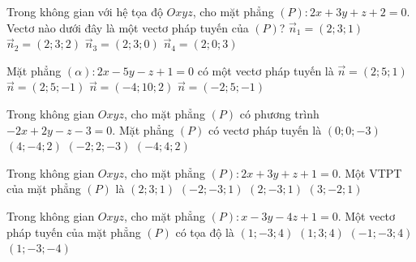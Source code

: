 \begin{ex}%
	Trong không  gian với hệ tọa độ $Oxyz$, cho mặt phẳng $(P)\colon 2x + 3y + z + 2 = 0$. Vectơ nào dưới đây là một vectơ pháp tuyến của $(P)$?
	 \choice
		{\True  $\overrightarrow{n}_1=(2;3;1)$}
		{$\overrightarrow{n}_2=(2;3;2)$} 
		 {$\overrightarrow{n}_3=(2;3;0)$}
		{$\overrightarrow{n}_4=(2;0;3)$} 
\end{ex}

\begin{ex}%
	[GV:Xuan Vy Pham] 
	Mặt phẳng $(\alpha) \colon 2x-5y-z+1=0$ có một vectơ pháp  tuyến là
	\choice 
		{$\overrightarrow{n}=(2;5;1)$} 
		 {$\overrightarrow{n}=(2;5;-1)$}
		{\True $\overrightarrow{n}=(-4;10;2)$} 
		 {$\overrightarrow{n}=(-2;5;-1)$}
\end{ex}

\begin{ex}%
	Trong không gian $Oxyz$, cho mặt phẳng $(P)$  có phương trình $-2x+2y-z-3=0$. Mặt phẳng $(P)$ có vectơ pháp tuyến là
	 \choice
		{\True $(0;  0;-3)$}
		 {\True $(4;-4; 2)$}
		 {$(-2; 2;-3)$}
		{$(-4;  4; 2)$}
\end{ex}

\begin{ex}%
	Trong không gian $Oxyz$, cho mặt phẳng $(P)\colon 2x+3y+z+1=0$. Một VTPT của mặt phẳng $(P)$ là 
	\choice 
		 {\True $(2;3;1)$}
		{$(-2;-3;1)$} 
		 {$(2;-3;1)$}
		 {$(3;-2;1)$}
\end{ex}

\begin{ex}%
	Trong không gian $Oxyz$, cho mặt phẳng $(P)\colon x-3y-4z+1=0$. Một vectơ pháp tuyến của mặt phẳng $(P)$ có  tọa độ là
	\choice 
		{$(1;-3;4)$} 
		{$(1;3;4)$} 
		 {$(-1;-3;4)$}
		{\True $(1;-3;-4)$} 
\end{ex}

